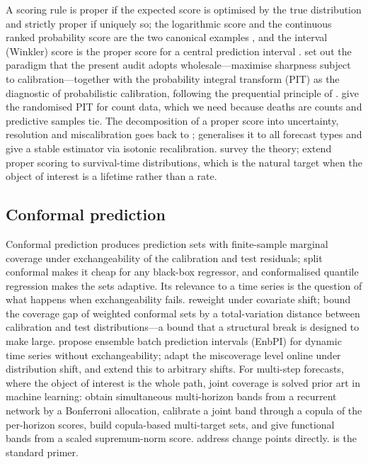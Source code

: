 A scoring rule is proper if the expected score is optimised by the true
distribution and strictly proper if uniquely so; the logarithmic score and
the continuous ranked probability score are the two canonical examples
\citep{gneiting2007strictly}, and the interval (Winkler) score is the proper
score for a central prediction interval \citep{winkler1972decision}.
\citet{gneiting2007probabilistic} set out the paradigm that the present audit
adopts wholesale---maximise sharpness subject to calibration---together
with the probability integral transform (PIT) as the diagnostic of
probabilistic calibration, following the prequential principle of
\citet{dawid1984present}. \citet{czado2009predictive} give the randomised
PIT for count data, which we need because deaths are counts and predictive
samples tie. The decomposition of a proper score into uncertainty,
resolution and miscalibration goes back to \citet{murphy1973new};
\citet{pohle2020murphy} generalises it to all forecast types and
\citet{dimitriadis2021stable} give a stable estimator via isotonic
recalibration. \citet{dawid2014theory} survey the theory;
\citet{yanagisawa2023proper} extend proper scoring to survival-time
distributions, which is the natural target when the object of interest is a
lifetime rather than a rate.

\subsection{Conformal prediction}

Conformal prediction \citep{vovk2005algorithmic} produces prediction sets
with finite-sample marginal coverage under exchangeability of the calibration
and test residuals; split conformal \citep{lei2018distribution} makes it
cheap for any black-box regressor, and conformalised quantile regression
\citep{romano2019conformalized} makes the sets adaptive. Its relevance to a
time series is the question of what happens when exchangeability fails.
\citet{tibshirani2019conformal} reweight under covariate shift;
\citet{barber2023conformal} bound the coverage gap of weighted conformal
sets by a total-variation distance between calibration and test
distributions---a bound that a structural break is designed to make large.
\citet{xu2021conformal} propose ensemble batch prediction intervals (EnbPI)
for dynamic time series without exchangeability; \citet{gibbs2021adaptive}
adapt the miscoverage level online under distribution shift, and
\citet{gibbs2024conformal} extend this to arbitrary shifts. For multi-step
forecasts, where the object of interest is the whole path, joint coverage
is solved prior art in machine learning: \citet{stankeviciute2021conformal}
obtain simultaneous multi-horizon bands from a recurrent network by a
Bonferroni allocation, \citet{sun2024copula} calibrate a joint band through
a copula of the per-horizon scores, \citet{messoudi2021copula} build
copula-based multi-target sets, and \citet{diquigiovanni2022conformal} give
functional bands from a scaled supremum-norm score. \citet{sun2025conformal}
address change points directly. \citet{angelopoulos2023gentle} is the
standard primer.

